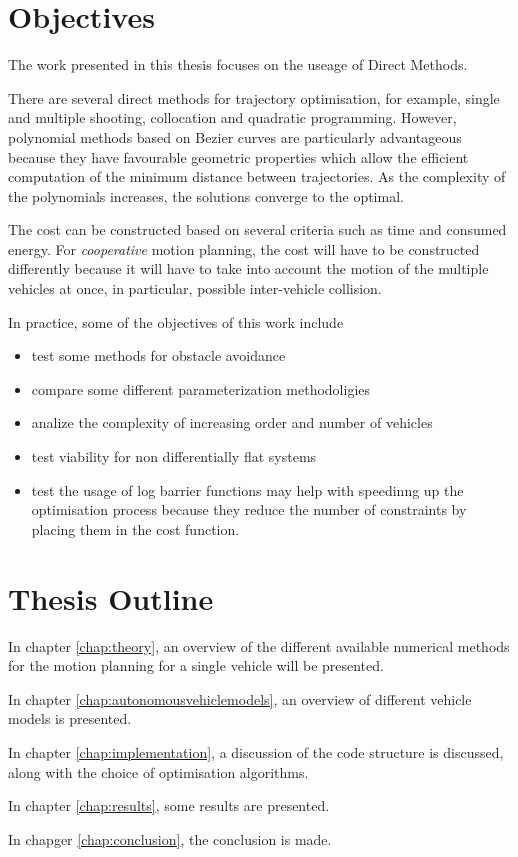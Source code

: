 \section{Objectives}


\par The work presented in this thesis focuses on the useage of Direct Methods.
\par There are several direct methods for trajectory optimisation, for example, single and multiple shooting, collocation and quadratic programming. However, polynomial methods based on Bezier curves are particularly advantageous because they have favourable geometric properties which allow the efficient computation of the minimum distance between trajectories. As the complexity of the polynomials increases, the solutions converge to the optimal.
\par The cost can be constructed based on several criteria such as time and consumed energy. For \textit{cooperative} motion planning, the cost will have to be constructed differently because it will have to take into account the motion of the multiple vehicles at once, in particular, possible inter-vehicle collision.
\par In practice, some of the objectives of this work include
\begin{itemize}
    \item test some methods for obstacle avoidance
    \item compare some different parameterization methodoligies
    \item analize the complexity of increasing order and number of vehicles
    \item test viability for non differentially flat systems
    \item test the usage of log barrier functions may help with speedinng up the optimisation process because they reduce the number of constraints by placing them in the cost function.
\end{itemize}


\section{Thesis Outline}

\par In chapter \ref{chap:theory}, an overview of the different available numerical methods for the motion planning for a single vehicle will be presented. 
\par In chapter \ref{chap:autonomousvehiclemodels}, an overview of different vehicle models is presented. 
\par In chapter \ref{chap:implementation}, a discussion of the code structure is discussed, along with the choice of optimisation algorithms. 
\par In chapter \ref{chap:results}, some results are presented. 
\par In chapger \ref{chap:conclusion}, the conclusion is made. 

